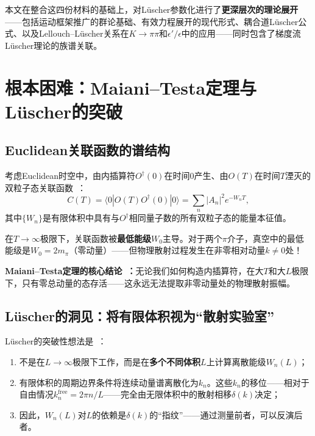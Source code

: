 \documentclass[12pt,a4paper]{ctexart}
\theoremstyle{definition}
\begin{document}
本文在整合这四份材料的基础上，对L\"uscher参数化进行了\textbf{更深层次的理论展开}——包括运动框架推广的群论基础、有效力程展开的现代形式、耦合道L\"uscher公式、以及Lellouch--L\"uscher关系在$K\to\pi\pi$和$\epsilon'/\epsilon$中的应用——同时包含了梯度流L\"uscher理论的族谱关联。

\section{根本困难：Maiani--Testa定理与L\"uscher的突破}

\subsection{Euclidean关联函数的谱结构}

考虑Euclidean时空中，由内插算符$O^\dagger(0)$在时间0产生、由$O(T)$在时间$T$湮灭的双粒子态关联函数~\cite{GattringerLang2010}：
\begin{equation}\label{eq:corr_T}
    C(T) = \langle 0 | O(T) O^\dagger(0) | 0 \rangle = \sum_n |A_n|^2 e^{-W_n T},
\end{equation}
其中$\{W_n\}$是有限体积中具有与$O^\dagger$相同量子数的所有双粒子态的能量本征值。

在$T \to \infty$极限下，关联函数被\textbf{最低能级}$W_0$主导。对于两个$\pi$介子，真空中的最低能级是$W_0 = 2m_\pi$（零动量）——但物理散射过程发生在非零相对动量$k \neq 0$处！

\textbf{Maiani--Testa定理的核心结论~\cite{decayChannels2026}：}无论我们如何构造内插算符，在大$T$和大$L$极限下，只有零总动量的态存活——这永远无法提取非零动量处的物理散射振幅。

\subsection{L\"uscher的洞见：将有限体积视为``散射实验室''}

L\"uscher的突破性想法是~\cite{GattringerLang2010}：
\begin{enumerate}[leftmargin=*]
    \item 不是在$L\to\infty$极限下工作，而是在\textbf{多个不同体积}$L$上计算离散能级$W_n(L)$；
    \item 有限体积的周期边界条件将连续动量谱离散化为$k_n$。这些$k_n$的移位——相对于自由情况$k_n^{\text{free}} = 2\pi n/L$——完全由无限体积中的散射相移$\delta(k)$决定；
    \item 因此，$W_n(L)$对$L$的依赖是$\delta(k)$的``指纹''——通过测量前者，可以反演后者。
\end{enumerate}
\end{document}
